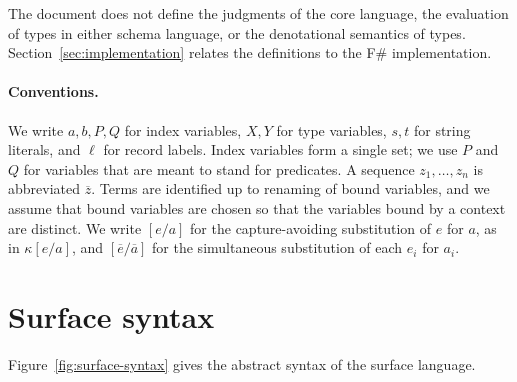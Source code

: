 \documentclass[11pt]{article}
\theoremstyle{remark}
\begin{document}
The document does not define the judgments of the core language, the evaluation of types in either
schema language, or the denotational semantics of types. Section~\ref{sec:implementation} relates
the definitions to the F\# implementation.

\paragraph{Conventions.}
We write $a, b, P, Q$ for index variables, $X, Y$ for type variables, $s, t$ for string literals,
and $\ell$ for record labels. Index variables form a single set; we use $P$ and $Q$ for variables
that are meant to stand for predicates. A sequence $z_1, \ldots, z_n$ is abbreviated $\overline{z}$.
Terms are identified up to renaming of bound variables, and we assume that bound variables are
chosen so that the variables bound by a context are distinct. We write $[e/a]$ for the
capture-avoiding substitution of $e$ for $a$, as in $\kappa[e/a]$, and
$[\overline{e}/\overline{a}]$ for the simultaneous substitution of each $e_i$ for $a_i$.

\section{Surface syntax}
\label{sec:surface-syntax}

Figure~\ref{fig:surface-syntax} gives the abstract syntax of the surface language.
\end{document}
